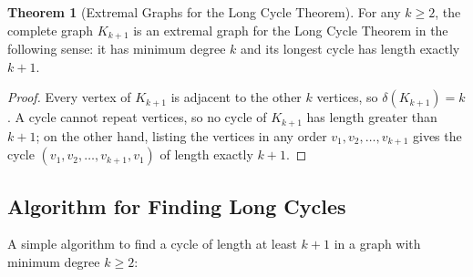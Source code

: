 \documentclass{article}
\theoremstyle{definition}
\newtheorem{theorem}{Theorem}
\begin{document}
\begin{theorem}[Extremal Graphs for the Long Cycle Theorem]
For any $k \geq 2$, the complete graph $K_{k+1}$ is an extremal graph for the Long Cycle Theorem in the following sense: it has minimum degree $k$ and its longest cycle has length exactly $k+1$.
\end{theorem}

\begin{proof}
Every vertex of $K_{k+1}$ is adjacent to the other $k$ vertices, so $\delta(K_{k+1}) = k$. A cycle cannot repeat vertices, so no cycle of $K_{k+1}$ has length greater than $k+1$; on the other hand, listing the vertices in any order $v_1, v_2, \ldots, v_{k+1}$ gives the cycle $(v_1, v_2, \ldots, v_{k+1}, v_1)$ of length exactly $k+1$.
\end{proof}

\subsection{Algorithm for Finding Long Cycles}
A simple algorithm to find a cycle of length at least $k+1$ in a graph with minimum degree $k \geq 2$:
\end{document}
